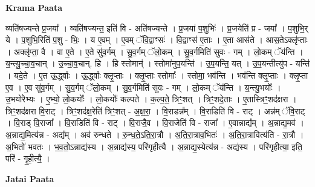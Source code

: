 \documentclass[17pt]{extarticle}
\begin{document}
\textbf{Krama Paata} \newline

व्यति॑षज्यन्ते प्र॒जया᳚ । व्यति॑षज्यन्त॒ इति॑ वि - अति॑षज्यन्ते । प्र॒जया॑ प॒शुभिः॑ । प्र॒जयेति॑ प्र - जया᳚ । 
प॒शुभि॒र् ये । प॒शुभि॒रिति॑ प॒शु - भिः॒ । य ए॒वम् । ए॒वम् ॅवि॒द्वाꣳसः॑ । वि॒द्वाꣳस॑ ए॒ताः । ए॒ता आस॑ते । आस॒तेऽक्लृ॑प्ताः । अक्लृ॑प्ता॒ वै । वा ए॒ते । ए॒ते सु॑व॒र्गम् । सु॒व॒र्गम् ॅलो॒कम् । सु॒व॒र्गमिति॑ सुवः - गम् । लो॒कम् ॅय॑न्ति । य॒न्त्यु॒च्चा॒व॒चान् । उ॒च्चा॒व॒चान्. हि । हि स्तोमान्॑ । स्तोमा॑नुप॒यन्ति॑ । उ॒प॒यन्ति॒ यत् । उ॒प॒यन्तीत्यु॑प - यन्ति॑ । यदे॒ते । ए॒त ऊ॒र्द्ध्वाः । ऊ॒र्द्ध्वाः क्लृ॒प्ताः । क्लृ॒प्ताः स्तोमाः᳚ । स्तोमा॒ भव॑न्ति । भव॑न्ति क्लृ॒प्ताः । क्लृ॒प्ता ए॒व । ए॒व सु॑व॒र्गम् । सु॒व॒र्गम् ॅलो॒कम् । सु॒व॒र्गमिति॑ सुवः - गम् । लो॒कम् ॅय॑न्ति । य॒न्त्यु॒भयोः᳚ । उ॒भयो॑रेभ्यः । ए॒भ्यो॒ लो॒कयोः᳚ । लो॒कयोः᳚ कल्पते । क॒ल्प॒ते॒ त्रिꣳ॒॒शत् । त्रिꣳ॒॒शदे॒ताः । ए॒तास्त्रिꣳ॒॒शद॑क्षरा । त्रिꣳ॒॒शद॑क्षरा वि॒राट् । त्रिꣳ॒॒शद॑क्ष॒रेति॑ त्रिꣳ॒॒शत् - अ॒क्ष॒रा॒ । वि॒राडन्न᳚म् । वि॒राडिति॑ वि - राट् । अन्न॑म् ॅवि॒राट् । वि॒राड् वि॒राजा᳚ । वि॒राडिति॑ वि - राट् । वि॒राजै॒व । वि॒राजेति॑ वि - राजा᳚ । ए॒वान्नाद्य᳚म् । अ॒न्नाद्य॒मव॑ । अ॒न्नाद्य॒मित्य॑न्न - अद्य᳚म् । अव॑ रुन्धते । रु॒न्ध॒ते॒ऽति॒रा॒त्रौ । अ॒ति॒रा॒त्राव॒भितः॑ । अ॒ति॒रा॒त्रावित्य॑ति - रा॒त्रौ । अ॒भितो॑ भवतः । भ॒व॒तो॒ऽन्नाद्य॑स्य । अ॒न्नाद्य॑स्य॒ परि॑गृहीत्यै । अ॒न्नाद्य॒स्येत्य॑न्न - अद्य॑स्य । परि॑गृहीत्या॒ इति॒ परि॑ - गृ॒ही॒त्यै॒ । \newline

\textbf{Jatai Paata} \newline
\end{document}
